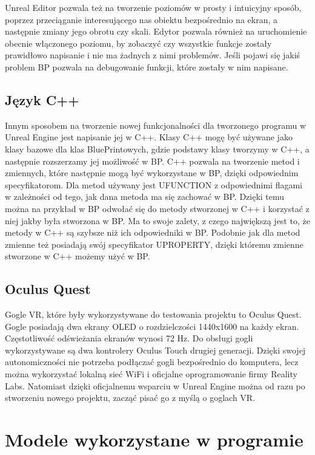\documentclass[a4paper,12pt,reqno]{article}
\begin{document}
Unreal Editor pozwala też na tworzenie poziomów w prosty i intuicyjny sposób, poprzez przeciąganie interesującego nas obiektu bezpośrednio na ekran, a następnie zmiany jego obrotu czy skali. Edytor pozwala również na uruchomienie obecnie włączonego poziomu, by zobaczyć czy wszystkie funkcje zostały prawidłowo napisanie i nie ma żadnych z nimi problemów. Jeśli pojawi się jakiś problem BP pozwala na debugowanie funkcji, które zostały w nim napisane.
\subsection{Język C++}

Innym sposobem na tworzenie nowej funkcjonalności dla tworzonego programu w Unreal Engine jest napisanie jej w C++. Klasy C++ mogę być używane jako klasy bazowe dla klas BluePrintowych, gdzie podstawy klasy tworzymy w C++, a następnie rozszerzamy jej możliwość w BP. C++ pozwala na tworzenie metod i zmiennych, które następnie mogą być wykorzystane w BP, dzięki odpowiednim specyfikatorom. Dla metod używany jest UFUNCTION z odpowiednimi flagami w zależności od tego, jak dana metoda ma się zachować w BP. Dzięki temu można na przykład w BP odwołać się do metody stworzonej w C++ i korzystać z niej jakby była stworzona w BP. Ma to swoje zalety, z czego największą jest to, że metody w C++ są szybsze niż ich odpowiedniki w BP. Podobnie jak dla metod zmienne też posiadają swój specyfikator UPROPERTY, dzięki któremu zmienne stworzone w C++ możemy użyć w BP.




\subsection{Oculus Quest}

Gogle VR, które były wykorzystywane do testowania projektu to Oculus Quest. Gogle posiadają dwa ekrany OLED o rozdzielczości 1440x1600 na każdy ekran. Częstotliwość odświeżania ekranów wynosi 72 Hz. Do obsługi gogli wykorzystywane są dwa kontrolery Oculus Touch drugiej generacji. Dzięki swojej autonomiczności nie potrzeba podłączać gogli bezpośrednio do komputera, lecz można wykorzystać lokalną sieć WiFi i oficjalne oprogramowanie firmy Reality Labs. Natomiast dzięki oficjalnemu wsparciu w Unreal Engine można od razu po stworzeniu nowego projektu, zacząć pisać go z myślą o goglach VR.


\section{Modele wykorzystane w programie}
\end{document}
